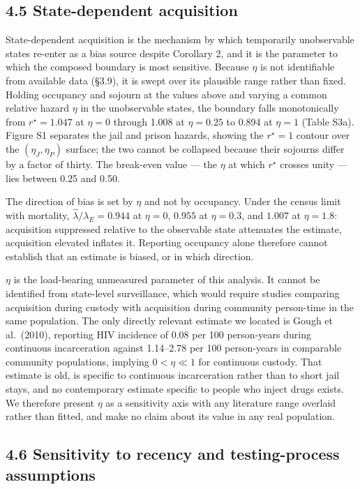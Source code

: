 \subsection{4.5 State-dependent acquisition}

State-dependent acquisition is the mechanism by which temporarily unobservable states re-enter as a bias source despite Corollary 2, and it is the parameter to which the composed boundary is most sensitive. Because \(\eta\) is not identifiable from available data (§3.9), it is swept over its plausible range rather than fixed. Holding occupancy and sojourn at the values above and varying a common relative hazard \(\eta\) in the unobservable states, the boundary falls monotonically from \(r^\star=1.047\) at \(\eta=0\) through 1.008 at \(\eta=0.25\) to 0.894 at \(\eta=1\) (Table S3a). Figure S1 separates the jail and prison hazards, showing the \(r^\star=1\) contour over the \((\eta_J,\eta_P)\) surface; the two cannot be collapsed because their sojourns differ by a factor of thirty. The break-even value --- the \(\eta\) at which \(r^\star\) crosses unity --- lies between 0.25 and 0.50.

The direction of bias is set by \(\eta\) and not by occupancy. Under the census limit with mortality, \(\hat\lambda/\lambda_E=0.944\) at \(\eta=0\), \(0.955\) at \(\eta=0.3\), and \(1.007\) at \(\eta=1.8\): acquisition suppressed relative to the observable state attenuates the estimate, acquisition elevated inflates it. Reporting occupancy alone therefore cannot establish that an estimate is biased, or in which direction.

\(\eta\) is the load-bearing unmeasured parameter of this analysis. It cannot be identified from state-level surveillance, which would require studies comparing acquisition during custody with acquisition during community person-time in the same population. The only directly relevant estimate we located is Gough et al.~(2010), reporting HIV incidence of 0.08 per 100 person-years during continuous incarceration against 1.14--2.78 per 100 person-years in comparable community populations, implying \(0<\eta\ll1\) for continuous custody. That estimate is old, is specific to continuous incarceration rather than to short jail stays, and no contemporary estimate specific to people who inject drugs exists. We therefore present \(\eta\) as a sensitivity axis with any literature range overlaid rather than fitted, and make no claim about its value in any real population.

\subsection{4.6 Sensitivity to recency and testing-process assumptions}

